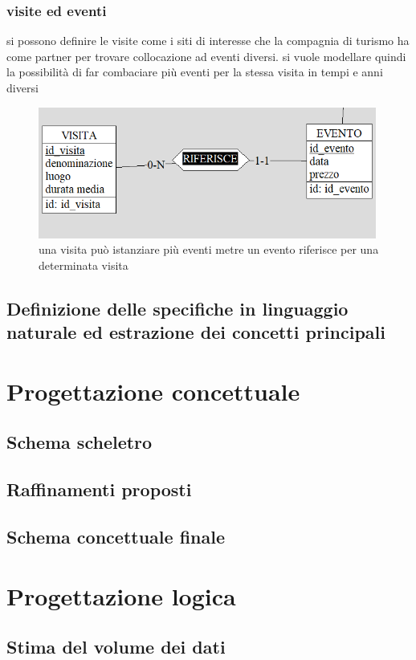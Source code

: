 \documentclass[a4paper,12pt]{report}
\begin{document}
\subsection*{visite ed eventi}
si possono definire le visite come i siti di interesse che la compagnia di turismo 
ha come partner per trovare collocazione ad eventi diversi. si vuole modellare quindi la 
possibilità di far combaciare più eventi per la stessa visita in tempi e anni diversi
\begin{figure}[H]
    \centering
    \includegraphics[width=0.99\textwidth]{visita-evento.png}
    \caption[short]{una visita può istanziare più eventi metre 
    un evento riferisce per una determinata visita}
    
\end{figure}
\section{Definizione delle specifiche in linguaggio naturale ed estrazione dei concetti principali}
\newpage
\chapter{Progettazione concettuale}
\section{Schema scheletro}
\section{Raffinamenti proposti}
\section{Schema concettuale finale}
\newpage
\chapter{Progettazione logica}
\section{Stima del volume dei dati}
\end{document}

